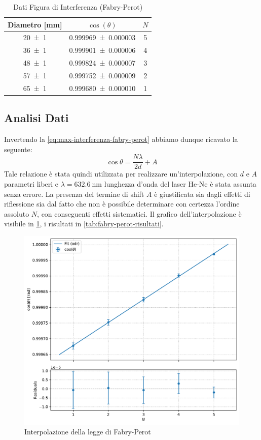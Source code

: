 \documentclass[a4paper]{article}
\begin{document}
\begin{table}[htbp]
\centering
\caption{Dati Figura di Interferenza (Fabry-Perot)}
\begin{tabular}{|c|c|c|}
\hline
Diametro [\si{\milli\meter}] & $\cos(\theta)$ & $N$ \\\hline\hline
\num{20 \pm 1} & \num{0.999969 \pm 0.000003}  & 5 \\
\num{36 \pm 1} & \num{0.999901 \pm 0.000006}  & 4 \\
\num{48 \pm 1} & \num{0.999824 \pm 0.000007}  & 3 \\
\num{57 \pm 1} & \num{0.999752 \pm 0.000009}  & 2 \\
\num{65 \pm 1} & \num{0.999680 \pm 0.000010}  & 1 \\
\hline
\end{tabular}
\label{tab:fabry-perot-dati}
\end{table}


\subsection{Analisi Dati}
Invertendo la \cref{eq:max-interferenza-fabry-perot} abbiamo dunque ricavato la seguente:
\[\cos \theta = \frac{N\lambda}{2d} + A\]
Tale relazione è stata quindi utilizzata per realizzare un'interpolazione,
con $d$ e $A$ parametri liberi e $\lambda=\SI{632.6}{\nano\meter}$ lunghezza d'onda del laser He-Ne è stata assunta senza errore. La presenza del termine di shift $A$ è giustificata sia dagli effetti di riflessione sia dal fatto che non è possibile determinare con certezza l'ordine assoluto $N$, con conseguenti effetti sistematici.
Il grafico dell'interpolazione è visibile in \cref{fig:fabry-perot-interpolazione}, i risultati in \cref{tab:fabry-perot-risultati}.

\begin{figure}[htbp]
\centering
\includegraphics[width=1.0\textwidth]{./grafici/fabry_perot_interferenza.pdf}
\caption{Interpolazione della legge di Fabry-Perot}
\label{fig:fabry-perot-interpolazione}
\end{figure}
\end{document}
